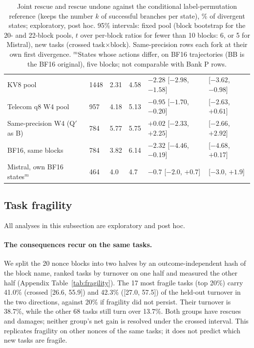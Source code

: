 \begin{table}[t]
\begin{tabular*}{\textwidth}{@{\extracolsep{\fill}}llllll@{}}
\tautwo{} KV8 pool & 1448 & 2.31 & 4.58 & $-2.28$ [$-2.98$, $-1.58$] & [$-3.62$, $-0.98$] \\
Telecom q8 W4 pool & 957 & 4.18 & 5.13 & $-0.95$ [$-1.70$, $-0.20$] & [$-2.63$, $+0.61$] \\
Same-precision W4 (Q$'$ as B) & 784 & 5.77 & 5.75 & $+0.02$ [$-2.33$, $+2.25$] & [$-2.66$, $+2.92$] \\
BF16, same blocks & 784 & 3.82 & 6.14 & $-2.32$ [$-4.46$, $-0.19$] & [$-4.68$, $+0.17$] \\
Mistral, own BF16 states$^m$ & 464 & 4.0 & 4.7 & $-0.7$ [$-2.0$, $+0.7$] & [$-3.0$, $+1.9$] \\
\bottomrule
\end{tabular*}
\par\vspace{6pt}
\caption{Joint rescue and rescue undone against the conditional label-permutation reference (keeps the number $k$ of successful branches per state), \% of divergent states; exploratory, post hoc. 95\% intervals: fixed pool (block bootstrap for the 20- and 22-block \tautwo{} pools, $t$ over per-block ratios for fewer than 10 blocks: 6, or 5 for Mistral), new tasks (crossed task$\times$block). Same-precision rows each fork at their own first divergence. $^m$States whose actions differ, on BF16 trajectories (BB is the BF16 original), five blocks; not comparable with Bank P rows.}
\label{tab:patternref}
\end{table}

\subsection{Task fragility}
\label{app:concentration}

All analyses in this subsection are exploratory and post hoc.

\paragraph{The consequences recur on the same tasks.} We split the 20 nonce blocks into two halves by an outcome-independent hash of the block name, ranked tasks by turnover on one half and measured the other half (Appendix Table~\ref{tab:fragility}). The 17 most fragile tasks (top 20\%) carry 41.0\% (crossed [26.6, 55.9]) and 42.3\% ([27.0, 57.5]) of the held-out turnover in the two directions, against 20\% if fragility did not persist. Their turnover is 38.7\%, while the other 68 tasks still turn over 13.7\%. Both groups have rescues and damages; neither group's net gain is resolved under the crossed interval. This replicates fragility on other nonces of the same tasks; it does not predict which new tasks are fragile. %

